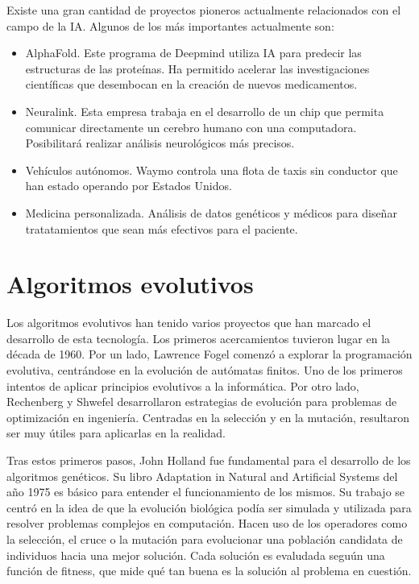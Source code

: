 Existe una gran cantidad de proyectos pioneros actualmente relacionados con el campo de la IA. Algunos de los más importantes actualmente son:

\begin{itemize}
    \item AlphaFold. Este programa de Deepmind utiliza IA para predecir las estructuras de las proteínas. Ha permitido acelerar las investigaciones científicas que desembocan en la creación de nuevos medicamentos.
    \item Neuralink. Esta empresa trabaja en el desarrollo de un chip que permita comunicar directamente un cerebro humano con una computadora. Posibilitará realizar análisis neurológicos más precisos.
    \item Vehículos autónomos. Waymo controla una flota de taxis sin conductor que han estado operando por Estados Unidos. 
    \item Medicina personalizada. Análisis de datos genéticos y médicos para diseñar tratatamientos que sean más efectivos para el paciente.
\end{itemize}

\newpage

\section{Algoritmos evolutivos}

Los algoritmos evolutivos han tenido varios proyectos que han marcado el desarrollo de esta tecnología. Los primeros acercamientos tuvieron lugar en la década de 1960. Por un lado, Lawrence Fogel comenzó a explorar la programación evolutiva, centrándose en la evolución de autómatas finitos. Uno de los primeros intentos de aplicar principios evolutivos a la informática. Por otro lado, Rechenberg y Shwefel desarrollaron estrategias de evolución para problemas de optimización en ingeniería. Centradas en la selección y en la mutación, resultaron ser muy útiles para aplicarlas en la realidad.

Tras estos primeros pasos, John Holland fue fundamental para el desarrollo de los algoritmos genéticos. Su libro Adaptation in Natural and Artificial Systems del año 1975 es básico para entender el funcionamiento de los mismos. Su trabajo se centró en la idea de que la evolución biológica podía ser simulada y utilizada para resolver problemas complejos en computación. Hacen uso de los operadores como la selección, el cruce o la mutación para evolucionar una población candidata de individuos hacia una mejor solución. Cada solución es evaludada seguún una función de fitness, que mide qué tan buena es la solución al problema en cuestión.

